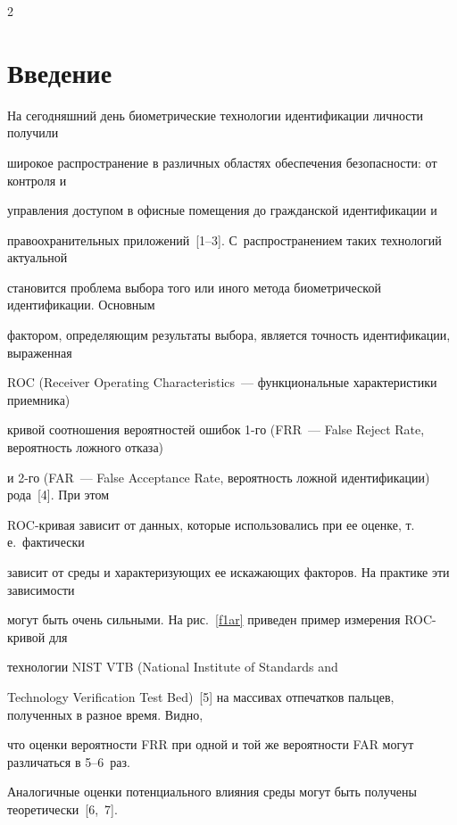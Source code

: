       \begin{multicols}{2}





      \label{st\stat}





\section{Введение }





  На сегодняшний день биометрические технологии идентификации личности получили 


широкое распространение в различных областях обеспечения безопасности: от контроля и 


управления доступом в офисные помещения до гражданской идентификации и 


правоохранительных приложений~[1--3]. С~распространением таких технологий актуальной 


становится проблема выбора того или иного метода биометрической идентификации. Основным 


фактором, определяющим результаты выбора, является точность идентификации, выраженная 


ROC (Receiver Operating Characteristics~--- функциональные характеристики приемника)


кривой соотношения вероятностей ошибок 1-го (FRR~--- False Reject Rate, вероятность ложного отказа)


и 2-го (FAR~--- False Acceptance Rate, вероятность ложной идентификации) рода~[4]. При этом 


  ROC-кривая зависит от данных, которые использовались при ее оценке, т.\,е.\ фактически 


зависит от среды и ха\-рак\-те\-ри\-зу\-ющих ее искажающих факторов. На практике эти зависимости 


могут быть очень сильными. На рис.~\ref{f1ar} приведен пример измерения ROC-кривой для 


технологии NIST VTB (National Institute of Standards and


Technology Verification Test Bed)~[5] на массивах отпечатков пальцев, полученных в разное время. Видно, 


что оценки вероятности FRR при одной и той же вероятности FAR могут различаться в 5--6~раз. 


Аналогичные оценки потенциального влияния среды могут быть получены теоретически~[6,~7].



\end{multicols}
